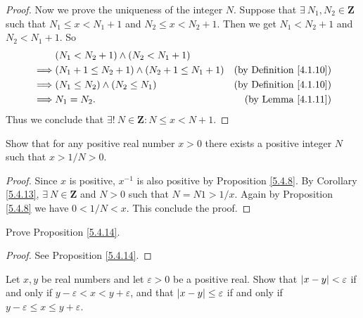 \begin{proof}
    Now we prove the uniqueness of the integer \(N\).
    Suppose that \(\exists\ N_1, N_2 \in \mathbf{Z}\) such that \(N_1 \leq x < N_1 + 1\) and \(N_2 \leq x < N_2 + 1\).
    Then we get \(N_1 < N_2 + 1\) and \(N_2 < N_1 + 1\).
    So
    \begin{align*}
                 & (N_1 < N_2 + 1) \land (N_2 < N_1 + 1)                                                     \\
        \implies & (N_1 + 1 \leq N_2 + 1) \land (N_2 + 1 \leq N_1 + 1) & \text{(by Definition \ref{4.1.10})} \\
        \implies & (N_1 \leq N_2) \land (N_2 \leq N_1)                 & \text{(by Definition \ref{4.1.10})} \\
        \implies & N_1 = N_2.                                          & \text{(by Lemma \ref{4.1.11})}
    \end{align*}
    Thus we conclude that \(\exists!\ N \in \mathbf{Z} : N \leq x < N + 1\).
\end{proof}

\begin{exercise}\label{ex 5.4.4}
    Show that for any positive real number \(x > 0\) there exists a positive integer \(N\) such that \(x > 1 / N > 0\).
\end{exercise}

\begin{proof}
    Since \(x\) is positive, \(x^{-1}\) is also positive by Proposition \ref{5.4.8}.
    By Corollary \ref{5.4.13}, \(\exists\ N \in \mathbf{Z}\) and \(N > 0\) such that \(N = N1 > 1 / x\).
    Again by Proposition \ref{5.4.8} we have \(0 < 1 / N < x\).
    This conclude the proof.
\end{proof}

\begin{exercise}\label{ex 5.4.5}
    Prove Proposition \ref{5.4.14}.
\end{exercise}

\begin{proof}
    See Proposition \ref{5.4.14}.
\end{proof}

\begin{exercise}\label{ex 5.4.6}
    Let \(x, y\) be real numbers and let \(\varepsilon > 0\) be a positive real.
    Show that \(\abs*{x - y} < \varepsilon\) if and only if \(y - \varepsilon < x < y + \varepsilon\), and that \(\abs*{x - y} \leq \varepsilon\) if and only if \(y - \varepsilon \leq x \leq y + \varepsilon\).
\end{exercise}

